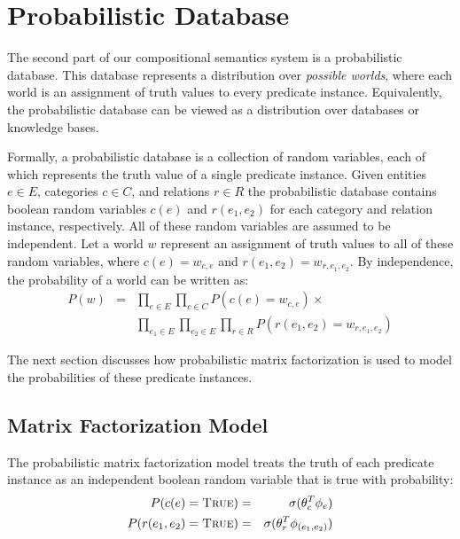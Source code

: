 \documentclass[11pt]{article}
\newcommand{\pred}[1]{\textsc{#1}}
\newcommand{\true}{\pred{True}}
\begin{document}
\section{Probabilistic Database}
\label{sec:probdb}

The second part of our compositional semantics system is a
probabilistic database. This database represents a distribution over
\emph{possible worlds}, where each world is an assignment of truth
values to every predicate instance. Equivalently, the probabilistic
database can be viewed as a distribution over databases or knowledge
bases.


Formally, a probabilistic database is a collection of random
variables, each of which represents the truth value of a single
predicate instance. Given entities $e \in E$, categories $c \in C$,
and relations $r \in R$ the probabilistic database contains boolean
random variables $c(e)$ and $r(e_1, e_2)$ for each category and
relation instance, respectively. All of these random variables are
assumed to be independent. Let a world $w$ represent an assignment of
truth values to all of these random variables, where $c(e) = w_{c,e}$
and $r(e_1, e_2) = w_{r, e_1, e_2}$. By independence, the probability
of a world can be written as:
\begin{eqnarray*}
P(w) & = & \prod_{e \in E} \prod_{c \in C} P( c(e) = w_{c,e}) \times \\
 & & \prod_{e_1\in E} \prod_{e_2 \in E} \prod_{r \in R} P(r(e_1, e_2) = w_{r, e_1, e_2})
\end{eqnarray*}

The next section discusses how probabilistic matrix factorization is
used to model the probabilities of these predicate instances.

\subsection{Matrix Factorization Model}

The probabilistic matrix factorization model treats the truth of each
predicate instance as an independent boolean random variable that is
true with probability:
\begin{eqnarray*}
P( c(e) = \true{}) & = & \sigma ( \theta_c^T \phi_e ) \\
P( r(e_1,e_2) = \true{}) & = & \sigma ( \theta_r^T \phi_{(e_1,e_2)} )
\end{eqnarray*}
\end{document}
